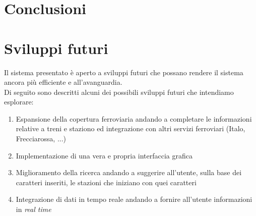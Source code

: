 \documentclass[italian,12pt,a4paper]{article}
\begin{document}
	\section{Conclusioni}
	\section{Sviluppi futuri}
	Il sistema presentato è aperto a sviluppi futuri che possano rendere il sistema ancora più efficiente e all'avanguardia. \\
	Di seguito sono descritti alcuni dei possibili sviluppi futuri che intendiamo esplorare:
	
	\begin{enumerate}
		\item Espansione della copertura ferroviaria andando a completare le informazioni relative a treni e staziono ed integrazione con altri servizi ferroviari (Italo, Frecciarossa, ...)
		\item Implementazione di una vera e propria interfaccia grafica
		\item Miglioramento della ricerca andando a suggerire all'utente, sulla base dei caratteri inseriti, le stazioni che iniziano con quei caratteri
		\item Integrazione di dati in tempo reale andando a fornire all'utente informazioni in \textit{real time}

	\end{enumerate}
	\printbibliography
	
\end{document}
